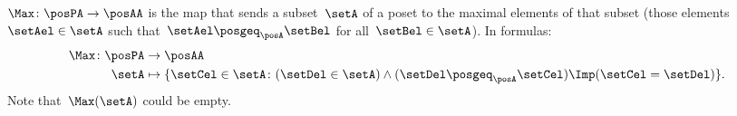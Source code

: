 \begin{definition}[Max]
    \label{def:Max}
    $\Max \colon \posPA \to \posAA$ is the map that sends a subset~$\setA$ of a poset to the maximal elements of that subset (those elements~$\setAel \in \setA$ such that~$\setAel \posgeq_\posA \setBel$ for all~$\setBel \in \setA$).
    In formulas:
    \begin{equation*}
        \begin{aligned}
            \Max \colon \posPA &\to \posAA\\
            \setA&\mapsto \{ \setCel\in \setA\colon (\setDel\in \setA)\wedge(\setDel\posgeq_\posA \setCel)\Imp (\setCel=\setDel)\}.
        \end{aligned}
    \end{equation*}
    Note that~$\Max(\setA)$ could be empty.
\end{definition}
%
%
%
